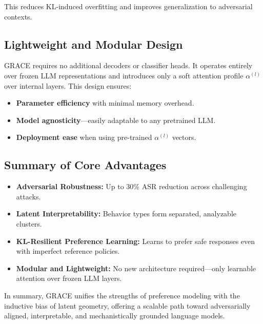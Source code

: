This reduces KL-induced overfitting and improves generalization to adversarial contexts.

\vspace{1mm}
\subsection*{Lightweight and Modular Design}

\textsc{GRACE} requires no additional decoders or classifier heads. It operates entirely over frozen LLM representations and introduces only a soft attention profile \(\alpha^{(l)}\) over internal layers. This design ensures:
\begin{itemize}[leftmargin=1.5em]
    \item \textbf{Parameter efficiency} with minimal memory overhead.
    \item \textbf{Model agnosticity}—easily adaptable to any pretrained LLM.
    \item \textbf{Deployment ease} when using pre-trained \(\alpha^{(l)}\) vectors.
\end{itemize}

\vspace{1mm}
\subsection*{Summary of Core Advantages}

\begin{itemize}[leftmargin=1.8em]
    \item \textbf{Adversarial Robustness:} Up to 30\% ASR reduction across challenging attacks.
    \item \textbf{Latent Interpretability:} Behavior types form separated, analyzable clusters.
    \item \textbf{KL-Resilient Preference Learning:} Learns to prefer safe responses even with imperfect reference policies.
    \item \textbf{Modular and Lightweight:} No new architecture required—only learnable attention over frozen LLM layers.
\end{itemize}

\vspace{1mm}
In summary, \textsc{GRACE} unifies the strengths of preference modeling with the inductive bias of latent geometry, offering a scalable path toward adversarially aligned, interpretable, and mechanistically grounded language models.








